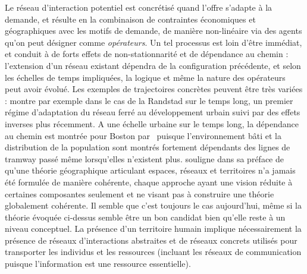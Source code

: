 { Le réseau d'interaction potentiel est concrétisé quand l'offre s'adapte à la demande, et résulte en la combinaison de contraintes économiques et géographiques avec les motifs de demande, de manière non-linéaire via des agents qu'on peut désigner comme \emph{opérateurs}. Un tel processus est loin d'être immédiat, et conduit à de forts effets de non-stationnarité et de dépendance au chemin : l'extension d'un réseau existant  dépendra de la configuration précédente, et selon les échelles de temps impliquées, la logique et même la nature des opérateurs peut avoir évolué. Les exemples de trajectoires concrètes peuvent être très variées : \cite{kasraian2015development} montre par exemple dans le cas de la Randstad sur le temps long, un premier régime d'adaptation du réseau ferré au développement urbain suivi par des effets inverses plus récemment. A une échelle urbaine sur le temps long, la dépendance au chemin  est montrée pour Boston par~\cite{block2012hysteresis} puisque l'environnement bâti et la distribution de la population sont montrés fortement dépendants des lignes de tramway passé même lorsqu'elles n'existent plus.  souligne dans sa préface de~\cite{offner1996reseaux} qu'une théorie géographique articulant espaces, réseaux et territoires n'a jamais été formulée de manière cohérente, chaque approche ayant une vision réduite à certaines composantes seulement et ne visant pas à construire une théorie globalement cohérente. Il semble que c'est toujours le cas aujourd'hui, même si la théorie évoquée ci-dessus semble être un bon candidat bien qu'elle reste à un niveau conceptuel. La présence d'un territoire humain implique nécessairement  la présence de réseaux d'interactions abstraites et de réseaux concrets utilisés pour transporter les individus et les ressources (incluant les réseaux de communication puisque l'information est une ressource essentielle). 
}






